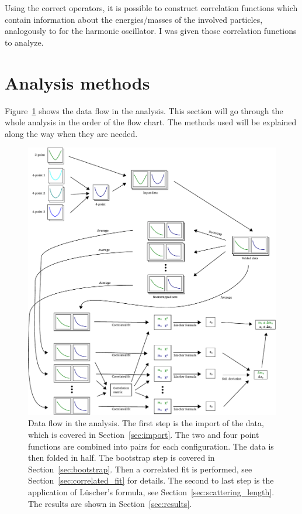 \documentclass[11pt, english, fleqn, DIV=10, headinclude]{scrartcl}
\begin{document}
Using the correct operators, it is possible to construct correlation functions
which contain information about the energies/masses of the involved particles,
analogously to \parencite[(4.14)]{Creutz/Statistical_Approach_QM} for the
harmonic oscillator. I was given those correlation functions to analyze.

\section{Analysis methods}

Figure~\ref{fig:analysis-flow} shows the data flow in the analysis. This
section will go through the whole analysis in the order of the flow chart. The
methods used will be explained along the way when they are needed.

\begin{figure}[htbp]
    \centering
    \includegraphics[width=\linewidth]{sketches/Zeichnung.pdf}
    \caption{%
        Data flow in the analysis. The first step is the import of the data,
        which is covered in Section~\ref{sec:import}. The two and four point
        functions are combined into pairs for each configuration. The data is
        then folded in half. The bootstrap step is covered in
        Section~\ref{sec:bootstrap}. Then a correlated fit is performed, see
        Section~\ref{sec:correlated_fit} for details. The second to last step
        is the application of Lüscher's formula, see
        Section~\ref{sec:scattering_length}. The results are shown in
        Section~\ref{sec:results}.
    }
    \label{fig:analysis-flow}
\end{figure}
\end{document}
